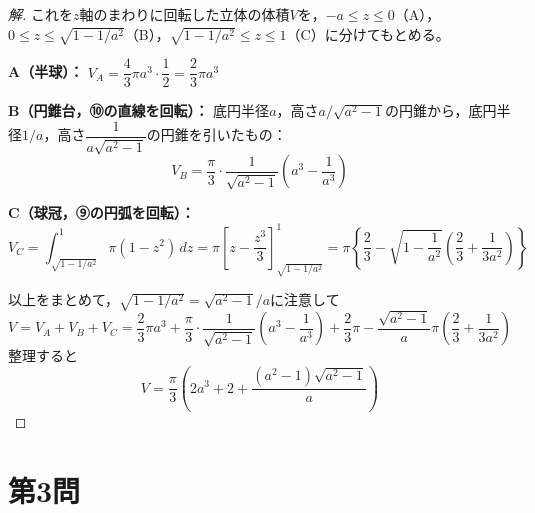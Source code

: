 \documentclass[../main.tex]{subfiles}
\begin{document}
\begin{proof}[解]
  これを$z$軸のまわりに回転した立体の体積$V$を，$-a\le z\le0$（A），$0\le z\le\sqrt{1-1/a^2}$（B），$\sqrt{1-1/a^2}\le z\le1$（C）に分けてもとめる。

  \textbf{A（半球）：} $V_A=\dfrac43\pi a^3\cdot\dfrac12=\dfrac23\pi a^3$

  \textbf{B（円錐台，⑩の直線を回転）：} 底円半径$a$，高さ$a/\sqrt{a^2-1}$の円錐から，底円半径$1/a$，高さ$\dfrac1{a\sqrt{a^2-1}}$の円錐を引いたもの：
  \[
    V_B=\frac\pi3\cdot\frac1{\sqrt{a^2-1}}\left(a^3-\frac1{a^3}\right)
  \]

  \textbf{C（球冠，⑨の円弧を回転）：}
  \[
    V_C=\int_{\sqrt{1-1/a^2}}^1\pi(1-z^2)\,dz=\pi\left[z-\frac{z^3}3\right]_{\sqrt{1-1/a^2}}^1=\pi\left\{\frac23-\sqrt{1-\frac1{a^2}}\left(\frac23+\frac1{3a^2}\right)\right\}
  \]

  以上をまとめて，$\sqrt{1-1/a^2}=\sqrt{a^2-1}/a$に注意して
  \[
    V=V_A+V_B+V_C=\frac23\pi a^3+\frac\pi3\cdot\frac1{\sqrt{a^2-1}}\left(a^3-\frac1{a^3}\right)+\frac23\pi-\frac{\sqrt{a^2-1}}a\pi\left(\frac23+\frac1{3a^2}\right)
  \]
  整理すると
  \[
    V=\frac\pi3\left(2a^3+2+\frac{(a^2-1)\sqrt{a^2-1}}a\right)
  \]
\end{proof}

\newpage

\section*{第3問}
\end{document}
